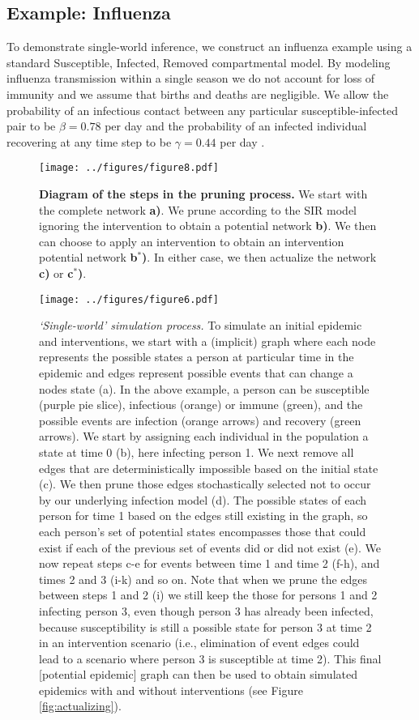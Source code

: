 \documentclass[PTRSB]{rsos}
\makeatletter
\def\checkGraphicsWidth{\ifdim\Gin@nat@width>\linewidth
	\tsGraphicsScaleX\linewidth\else\Gin@nat@width\fi}
\let\ts@includegraphics\includegraphics
\renewcommand{\includegraphics}[1]{\ts@includegraphics[width=\checkGraphicsWidth]{#1}}
\makeatother
\begin{document}
\begin{multicols}{2}
\subsection{Example: Influenza}
To demonstrate single-world inference, we construct an influenza example using a standard Susceptible, Infected, Removed compartmental model.
By modeling influenza transmission within a single season we do not account for loss of immunity and we assume that births and deaths are negligible.
We allow the probability of an infectious contact between any particular susceptible-infected pair to be $\beta = 0.78$ per day and the probability of an infected individual recovering at any time step to be $\gamma = 0.44$ per day \cite{forsberg-white-et-al:2009}.

\begin{figure}[hp]
\texttt{[image: ../figures/figure8.pdf]}
\caption{\textbf{Diagram of the steps in the pruning process.}  We start with the complete network \textbf{a)}.  We prune according to the SIR model ignoring the intervention to obtain a potential network \textbf{b)}.  We then can choose to apply an intervention to obtain an intervention potential network \textbf{b${}^*$)}.  In either case, we then actualize the network \textbf{c)} or \textbf{c${}^*$)}.}
\label{fig:outline}
\end{figure}

\begin{figure}[hp]
\texttt{[image: ../figures/figure6.pdf]}
\caption{\textit{‘Single-world’ simulation process.}
  To simulate an initial epidemic and interventions, we start with a (implicit) graph where each node represents the possible states a person at particular time in the epidemic and edges represent possible events that can change a nodes state (a).
  In the above example, a person can be susceptible (purple pie slice), infectious (orange) or immune (green), and the possible events are infection (orange arrows) and recovery (green arrows).
  We start by assigning each individual in the population a state at time 0 (b), here infecting person 1.
  We next remove all edges that are deterministically impossible based on the initial state (c).
  We then prune those edges stochastically selected not to occur by our underlying infection model (d).
  The possible states of each person for time 1 based on the edges still existing in the graph, so each person’s set of potential states encompasses those that could exist if each of the previous set of events did or did not exist (e).
  We now repeat steps c-e for events between time 1 and time 2 (f-h), and times 2 and 3 (i-k) and so on.
  Note that when we prune the edges between steps 1 and 2 (i) we still keep the those for persons 1 and 2 infecting person 3, even though person 3 has already been infected, because susceptibility is still a possible state for person 3 at time 2 in an intervention scenario (i.e., elimination of event edges could lead to a scenario where person 3 is susceptible at time 2).
  This final [potential epidemic] graph can then be used to obtain simulated epidemics with and without interventions (see Figure \ref{fig:actualizing}).
}
\label{fig:pruning}
\end{figure}


\end{multicols}
\end{document}
